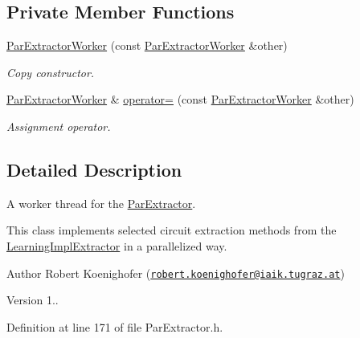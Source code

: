 \subsection*{Private Member Functions}
\begin{DoxyCompactItemize}
\item 
\hyperlink{classParExtractorWorker_af0d2424f3f3c99b31eafd6bfe326ec3f}{Par\-Extractor\-Worker} (const \hyperlink{classParExtractorWorker}{Par\-Extractor\-Worker} \&other)
\begin{DoxyCompactList}\small\item\em Copy constructor. \end{DoxyCompactList}\item 
\hyperlink{classParExtractorWorker}{Par\-Extractor\-Worker} \& \hyperlink{classParExtractorWorker_a71f88975a5069d748c0af0cc13cea6bd}{operator=} (const \hyperlink{classParExtractorWorker}{Par\-Extractor\-Worker} \&other)
\begin{DoxyCompactList}\small\item\em Assignment operator. \end{DoxyCompactList}\end{DoxyCompactItemize}


\subsection{Detailed Description}
A worker thread for the \hyperlink{classParExtractor}{Par\-Extractor}. 

This class implements selected circuit extraction methods from the \hyperlink{classLearningImplExtractor}{Learning\-Impl\-Extractor} in a parallelized way.

\begin{DoxyAuthor}{Author}
Robert Koenighofer (\href{mailto:robert.koenighofer@iaik.tugraz.at}{\tt robert.\-koenighofer@iaik.\-tugraz.\-at}) 
\end{DoxyAuthor}
\begin{DoxyVersion}{Version}
1.. 
\end{DoxyVersion}


Definition at line 171 of file Par\-Extractor.\-h.



